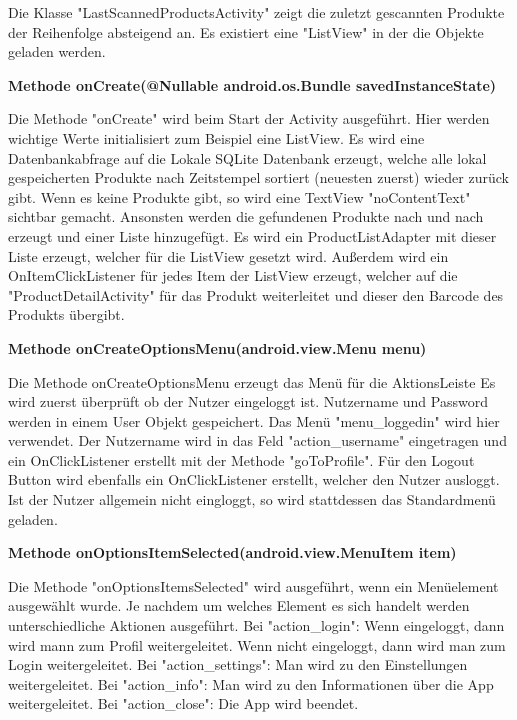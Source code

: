 \documentclass{scrartcl}
\begin{document}
Die Klasse "LastScannedProductsActivity" zeigt die zuletzt gescannten Produkte der Reihenfolge absteigend an. Es existiert eine "ListView" in der die Objekte geladen werden. \newline

\noindent\textbf{Methode onCreate(@Nullable android.os.Bundle savedInstanceState)}

\noindent Die Methode "onCreate" wird beim Start der Activity ausgeführt. Hier werden wichtige Werte initialisiert zum Beispiel eine ListView. Es wird eine Datenbankabfrage auf die Lokale SQLite Datenbank erzeugt, welche alle lokal gespeicherten Produkte nach Zeitstempel sortiert (neuesten zuerst) wieder zurück gibt. Wenn es keine Produkte gibt, so wird eine TextView "noContentText" sichtbar gemacht. Ansonsten werden die gefundenen Produkte nach und nach erzeugt und einer Liste hinzugefügt. Es wird ein ProductListAdapter mit dieser Liste erzeugt, welcher für die ListView gesetzt wird. Außerdem wird ein OnItemClickListener für jedes Item der ListView erzeugt, welcher auf die "ProductDetailActivity" für das Produkt weiterleitet und dieser den Barcode des Produkts übergibt. \newline

\noindent\textbf{Methode onCreateOptionsMenu(android.view.Menu menu)}

\noindent Die Methode onCreateOptionsMenu erzeugt das Menü für die AktionsLeiste Es wird zuerst überprüft ob der Nutzer eingeloggt ist. Nutzername und Password werden in einem User Objekt gespeichert. Das Menü "menu\_loggedin" wird hier verwendet. Der Nutzername wird in das Feld "action\_username" eingetragen und ein OnClickListener erstellt mit der Methode "goToProfile". Für den Logout Button wird ebenfalls ein OnClickListener erstellt, welcher den Nutzer ausloggt. Ist der Nutzer allgemein nicht eingloggt, so wird stattdessen das Standardmenü geladen. \newline

\noindent\textbf{Methode onOptionsItemSelected(android.view.MenuItem item)} 

\noindent Die Methode "onOptionsItemsSelected" wird ausgeführt, wenn ein Menüelement ausgewählt wurde. Je nachdem um welches Element es sich handelt werden unterschiedliche Aktionen ausgeführt. Bei "action\_login": Wenn eingeloggt, dann wird mann zum Profil weitergeleitet. Wenn nicht eingeloggt, dann wird man zum Login weitergeleitet. Bei "action\_settings": Man wird zu den Einstellungen weitergeleitet. Bei "action\_info": Man wird zu den Informationen über die App weitergeleitet. Bei "action\_close": Die App wird beendet. \newline
\end{document}
